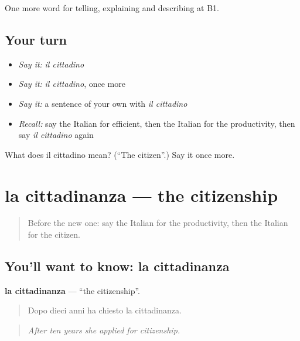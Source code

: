 \begin{grammarlens}[title={What you've built}]
One more word for telling, explaining and describing at B1.
\end{grammarlens}

\subsection*{Your turn}
\begin{itemize}
\raggedright
  \item \emph{Say it:} \emph{il cittadino}
  \item \emph{Say it:} \emph{il cittadino}, once more
  \item \emph{Say it:} a sentence of your own with \emph{il cittadino}
  \item \emph{Recall:} say the Italian for efficient, then the Italian for the productivity, then say \emph{il cittadino} again
\end{itemize}

\begin{tcolorbox}[breakable,colback=teal!4,colframe=teal!35!black,title={Before you move on}]
What does il cittadino mean? (\textquotedblleft{}The citizen\textquotedblright{}.) Say it once more.
\end{tcolorbox}
\section[la cittadinanza]{la cittadinanza — the citizenship}

\label{lesson:IT-C363-cittadinanza}



\begin{quote}
Before the new one: say the Italian for the productivity, then the Italian for the citizen.
\end{quote}

\subsection*{You'll want to know: la cittadinanza}
\textbf{la cittadinanza} — \textquotedblleft{}the citizenship\textquotedblright{}.

\begin{quote}
Dopo dieci anni ha chiesto la cittadinanza.
\end{quote}

\begin{quote}
\emph{After ten years she applied for citizenship.}
\end{quote}

